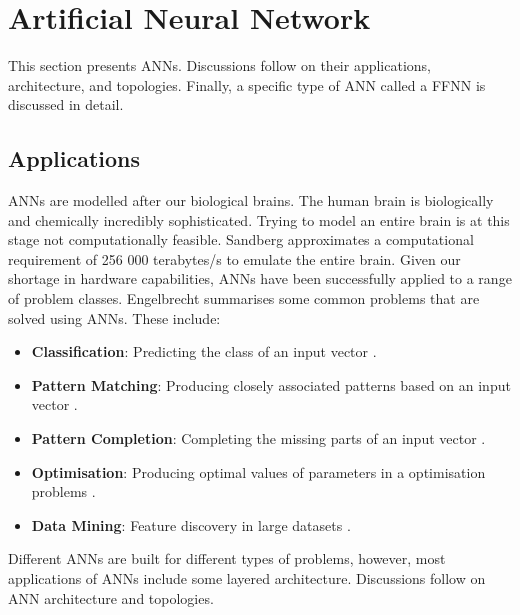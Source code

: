 \section{Artificial Neural Network}
\label{sec:anns:ann}

This section presents \acp{ANN}. Discussions follow on their applications,
architecture, and topologies. Finally, a specific type of \ac{ANN} called a
\acl{FFNN} is discussed in detail.

\subsection{Applications}
\label{sec:anns:anns:applications}

\acp{ANN} are modelled after our biological brains. The human brain is
biologically and chemically incredibly sophisticated. Trying to model an entire
brain is at this stage not computationally feasible. Sandberg
\cite{ref:sandberg:2008} approximates a computational requirement of 256 000
terabytes/s to emulate the entire brain. Given our shortage in hardware
capabilities, \acp{ANN} have been successfully applied to a range of problem
classes. Engelbrecht \cite{ref:engelbrecht:2007} summarises some common problems
that are solved using \acp{ANN}. These include: 

\begin{itemize}
    \item
    \textbf{Classification}: Predicting the class of an input vector
    \cite{ref:khan:2001}.
    
    \item
    \textbf{Pattern Matching}: Producing closely associated patterns based on an
    input vector \cite{ref:cannady:1998, ref:kumar:1994}.
    
    \item
    \textbf{Pattern Completion}: Completing the missing parts of an input vector
    \cite{ref:dayhoff:2001}.

    \item
    \textbf{Optimisation}: Producing optimal values of parameters in a
    optimisation problems \cite{ref:specht:1991}.

    \item
    \textbf{Data Mining}: Feature discovery in large datasets
    \cite{ref:singh:2009}.
\end{itemize}

Different \acp{ANN} are built for different types of problems, however, most
applications of \acp{ANN} include some layered architecture. Discussions follow
on \ac{ANN} architecture and topologies.

